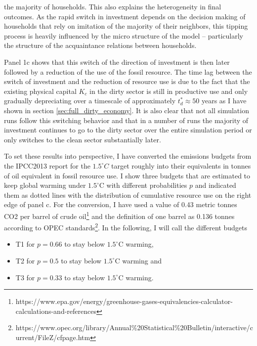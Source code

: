 the majority of households. This also explains the heterogeneity in final outcomes. As the rapid switch in investment depends on the decision making of households that rely on imitation of the majority of their neighbors, this tipping process is heavily influenced by the micro structure of the model -- particularly the structure of the acquaintance relations between households.

Panel 1c shows that this switch of the direction of investment is then later followed by a reduction of the use of the fossil resource. The time lag between the switch of investment and the reduction of resource use is due to the fact that the existing physical capital $K_c$ in the dirty sector is still in productive use and only gradually depreciating over a timescale of approximately $t_{d}^{*}\approx 50$ years as I have shown in section \ref{sec:full_dirty_economy}. It is also clear that not all simulation runs follow this switching behavior and that in a number of runs the majority of investment continues to go to the dirty sector over the entire simulation period or only switches to the clean sector substantially later.

To set these results into perspective, I have converted the emissions budgets from the IPCC2013 report \cite{stocker2013climate} for the $1.5^{\circ}C$ target roughly into their equivalents in tonnes of oil equivalent in fossil resource use. I show three budgets that are estimated to keep global warming under $1.5^{\circ}$C with different probabilities $p$ and indicated them as dotted lines with the distribution of cumulative resource use on the right edge of panel c. For the conversion, I have used a value of 0.43 metric tonnes CO2 per barrel of crude oil\footnote{https://www.epa.gov/energy/greenhouse-gases-equivalencies-calculator-calculations-and-references} and the definition of one barrel as 0.136 tonnes according to OPEC standards\footnote{https://www.opec.org/library/Annual\%20Statistical\%20Bulletin/interactive/current/FileZ/cfpage.htm}.
In the following, I will call the different budgets
\begin{itemize}
  \item T1 for $p=0.66$ to stay below $1.5^{\circ}$C warming,
  \item T2 for $p=0.5$ to stay below $1.5^{\circ}$C warming and
  \item T3 for $p=0.33$ to stay below $1.5^{\circ}$C warming.
\end{itemize}


